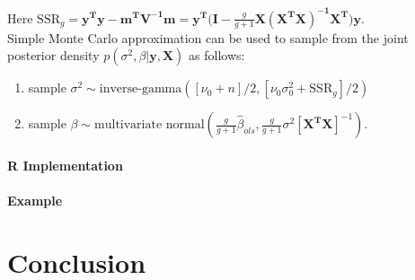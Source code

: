 \documentclass[12pt, a4paper]{article}
\begin{document}
Here $\text{SSR}_g = \mathbf{y^Ty - m^TV^{-1}m = y^T(I - }\frac{g}{g+1}\mathbf{X(X^TX)^{-1}X^T)y}$.\\

Simple Monte Carlo approximation can be used to sample from the joint posterior density $p(\sigma^2,\beta|\mathbf{y,X})$ as follows:

\begin{enumerate}
    \item sample $\sigma^2 \sim \text{inverse-gamma}([\nu_0 + n]/2,[\nu_0\sigma^2_0 + \text{SSR}_g]/2)$
    \item sample $\beta \sim \text{multivariate normal}\left(\frac{g}{g+1}\hat{\beta}_{ols},\frac{g}{g+1}\sigma^2[\mathbf{X^TX}]^{-1}\right)$.
\end{enumerate}

  \paragraph{R Implementation}
  \paragraph{Example}


\clearpage

\section{Conclusion}
\end{document}
